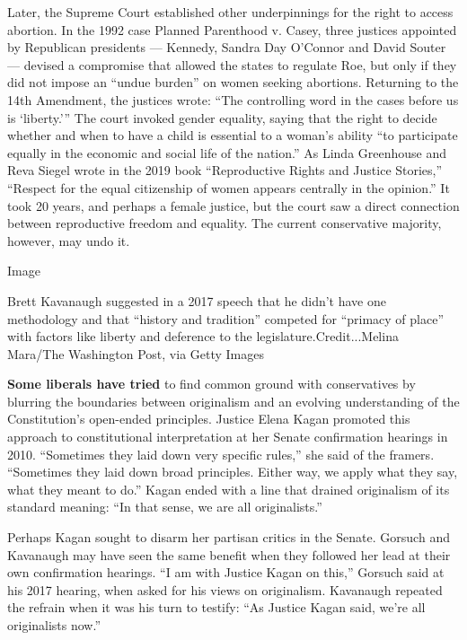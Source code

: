 Later, the Supreme Court established other underpinnings for the right
to access abortion. In the 1992 case Planned Parenthood v. Casey, three
justices appointed by Republican presidents --- Kennedy, Sandra Day
O'Connor and David Souter --- devised a compromise that allowed the
states to regulate Roe, but only if they did not impose an ``undue
burden'' on women seeking abortions. Returning to the 14th Amendment,
the justices wrote: ``The controlling word in the cases before us is
`liberty.''' The court invoked gender equality, saying that the right to
decide whether and when to have a child is essential to a woman's
ability ``to participate equally in the economic and social life of the
nation.'' As Linda Greenhouse and Reva Siegel wrote in the 2019 book
``Reproductive Rights and Justice Stories,'' ``Respect for the equal
citizenship of women appears centrally in the opinion.'' It took 20
years, and perhaps a female justice, but the court saw a direct
connection between reproductive freedom and equality. The current
conservative majority, however, may undo it.

Image

Brett Kavanaugh suggested in a 2017 speech that he didn't have one
methodology and that ``history and tradition'' competed for ``primacy of
place'' with factors like liberty and deference to the
legislature.Credit...Melina Mara/The Washington Post, via Getty Images

\textbf{Some liberals have tried} to find common ground with
conservatives by blurring the boundaries between originalism and an
evolving understanding of the Constitution's open-ended principles.
Justice Elena Kagan promoted this approach to constitutional
interpretation at her Senate confirmation hearings in 2010. ``Sometimes
they laid down very specific rules,'' she said of the framers.
``Sometimes they laid down broad principles. Either way, we apply what
they say, what they meant to do.'' Kagan ended with a line that drained
originalism of its standard meaning: ``In that sense, we are all
originalists.''

Perhaps Kagan sought to disarm her partisan critics in the Senate.
Gorsuch and Kavanaugh may have seen the same benefit when they followed
her lead at their own confirmation hearings. ``I am with Justice Kagan
on this,'' Gorsuch said at his 2017 hearing, when asked for his views on
originalism. Kavanaugh repeated the refrain when it was his turn to
testify: ``As Justice Kagan said, we're all originalists now.''

